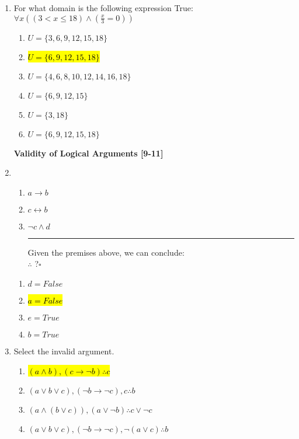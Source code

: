 \documentclass{article}
\renewcommand{\implies}{\rightarrow}
\begin{document}
\begin{enumerate}
\item For what domain is the following expression True: $\forall x((3<x\leq18)\land (\frac{x}{3}=0))$
\begin{enumerate}
\item $U=\{3,6, 9, 12, 15, 18\}$
\item \hl{$U=\{6, 9, 12, 15, 18\}$}
\item $U=\{4, 6, 8, 10,12, 14,16, 18\}$
\item $U=\{6, 9, 12, 15\}$
\item $U=\{3,18\}$
\item $U=\{6, 9, 12, 15,18\}$
\end{enumerate}

\newpage

\textbf{Validity of Logical Arguments [9-11]}

\item 
\begin{enumerate}[label =(\arabic*), ref = \arabic*]
	\item $a\implies b$
	\item $c\leftrightarrow b$
	\item $\neg c\land d$ \hspace{50pt}\vspace{3pt}
	\vspace{5pt} \hrule \vspace{5pt}
	Given the premises above, we can conclude:\\$\therefore $ ?\hfill $\square$
\end{enumerate} 
\begin{enumerate}
\item $d=False$
\item \hl{$a=False$}
\item $e=True$
\item $b=True$
\end{enumerate}

\item Select the invalid argument.
\begin{enumerate}
\item \hl{$(a\land b), (c\implies \neg b)$}\hl{\quad$\therefore c$}
\item $(a\lor b\lor c), (\neg b\implies \neg c), c$\quad$\therefore b$
\item $(a\land(b\lor c)), (a\lor\neg b)$\quad$\therefore c\lor\neg c$
\item $(a\lor b\lor c), (\neg b\implies \neg c), \neg(a\lor c)$\quad$\therefore b$
\end{enumerate}


\end{enumerate}
\end{document}
